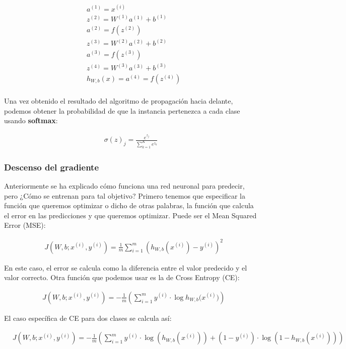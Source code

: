 \begin{align*}
&a^{(1)} = x^{(i)} \\
&z^{(2)} = W^{(1)}a^{(1)} + b^{(1)} \\
&a^{(2)} = f(z^{(2)}) \\
&z^{(3)} = W^{(2)}a^{(2)} + b^{(2)} \\
&a^{(3)} = f(z^{(3)}) \\
&z^{(4)} = W^{(3)}a^{(3)} + b^{(3)} \\
&h_{W,b}(x) = a^{(4)} = f(z^{(4)})\\
\end{align*}

Una vez obtenido el resultado del algoritmo de propagación hacia delante, podemos obtener la probabilidad de que la instancia pertenezca a cada clase usando \textbf{softmax}:

\begin{align*}
\sigma (z)_j = \frac{e^{z_j}}{\sum^{K}_{k=1} e^{z_k}}
\end{align*}

\subsubsection{Descenso del gradiente}

Anteriormente se ha explicado cómo funciona una red neuronal para predecir, pero ¿Cómo se entrenan para tal objetivo? Primero tenemos que especificar la función que queremos optimizar o dicho de otras palabras, la función que calcula el error en las predicciones y que queremos optimizar. Puede ser el Mean Squared Error (MSE):

\begin{align*}
	&J(W,b;x^{(i)},y^{(i)}) = \frac{1}{m} \sum^m_{i=1} (h_{W,b}(x^{(i)}) - y^{(i)} )^2
\end{align*}

En este caso, el error se calcula como la diferencia entre el valor predecido y el valor correcto. Otra función que podemos usar es la de Cross Entropy (CE):

\begin{align*}
	&J(W,b;x^{(i)},y^{(i)}) = - \frac{1}{m}\left(\sum^m_{i=1} y^{(i)} \cdot \log{h_{W,b}(x^{(i)}})\right)
\end{align*}

El caso específica de CE para dos clases se calcula así:

\begin{align*}
	&J(W,b;x^{(i)},y^{(i)}) = - \frac{1}{m} \left( \sum^m_{i=1} y^{(i)} \cdot \log (h_{W,b}(x^{(i)})) + (1 - y^{(i)}) \cdot \log (1 - h_{W,b}(x^{(i)})) \right)
\end{align*}

